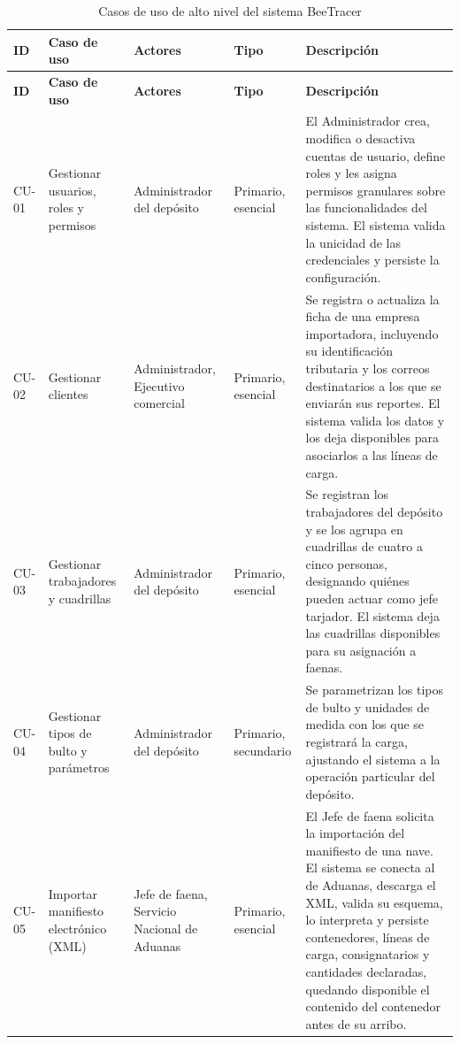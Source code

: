 {\estilotabla
\begin{longtable}{L{0.06\textwidth} L{0.18\textwidth} L{0.14\textwidth} L{0.11\textwidth} L{0.41\textwidth}}

\caption{Casos de uso de alto nivel del sistema BeeTracer}
\label{tab:cu_altonivel}
\\

\toprule
\textbf{ID} & \textbf{Caso de uso} & \textbf{Actores} & \textbf{Tipo} & \textbf{Descripción} \\
\midrule
\endfirsthead

\toprule
\textbf{ID} & \textbf{Caso de uso} & \textbf{Actores} & \textbf{Tipo} & \textbf{Descripción} \\
\midrule
\endhead

CU-01 & Gestionar usuarios, roles y permisos & Administrador del depósito & Primario, esencial &
El Administrador crea, modifica o desactiva cuentas de usuario, define roles y les asigna permisos
granulares sobre las funcionalidades del sistema. El sistema valida la unicidad de las credenciales
y persiste la configuración. \\
\midrule

CU-02 & Gestionar clientes & Administrador, Ejecutivo comercial & Primario, esencial &
Se registra o actualiza la ficha de una empresa importadora, incluyendo su identificación
tributaria y los correos destinatarios a los que se enviarán sus reportes. El sistema valida los
datos y los deja disponibles para asociarlos a las líneas de carga. \\
\midrule

CU-03 & Gestionar trabajadores y cuadrillas & Administrador del depósito & Primario, esencial &
Se registran los trabajadores del depósito y se los agrupa en cuadrillas de cuatro a cinco
personas, designando quiénes pueden actuar como jefe tarjador. El sistema deja las cuadrillas
disponibles para su asignación a faenas. \\
\midrule

CU-04 & Gestionar tipos de bulto y parámetros & Administrador del depósito & Primario, secundario &
Se parametrizan los tipos de bulto y unidades de medida con los que se registrará la carga,
ajustando el sistema a la operación particular del depósito. \\
\midrule

CU-05 & Importar manifiesto electrónico (XML) & Jefe de faena, Servicio Nacional de Aduanas &
Primario, esencial &
El Jefe de faena solicita la importación del manifiesto de una nave. El sistema se conecta al
 de Aduanas, descarga el XML, valida su esquema, lo interpreta y persiste
contenedores, líneas de carga, consignatarios y cantidades declaradas, quedando disponible el
contenido del contenedor antes de su arribo. \\
\midrule


\end{longtable}}

